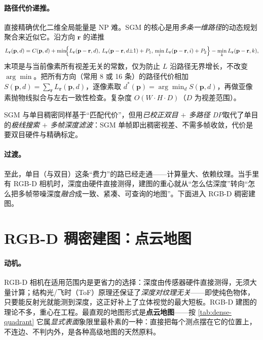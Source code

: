 \paragraph{路径代价递推。}
直接精确优化二维全局能量是 NP 难。SGM 的核心是用\emph{多条一维路径}的动态规划聚合来近似它。沿方向 $\mathbf{r}$ 的递推
\begin{equation}
  L_{\mathbf{r}}(\mathbf{p},d)=C(\mathbf{p},d)+\min\!\Bigl\{
   L_{\mathbf{r}}(\mathbf{p}-\mathbf{r},d),\,
   L_{\mathbf{r}}(\mathbf{p}-\mathbf{r},d{\pm}1)+P_1,\,
   \min_i L_{\mathbf{r}}(\mathbf{p}-\mathbf{r},i)+P_2\Bigr\}
   -\min_k L_{\mathbf{r}}(\mathbf{p}-\mathbf{r},k),
  \label{eq:dense-sgm-path}
\end{equation}
末项是与当前像素所有视差无关的常数，仅为防止 $L$ 沿路径无界增长，不改变 $\arg\min$。把所有方向（常用 8 或 16 条）的路径代价相加 $S(\mathbf{p},d)=\sum_{\mathbf{r}}L_{\mathbf{r}}(\mathbf{p},d)$，逐像素取 $d^*(\mathbf{p})=\arg\min_d S(\mathbf{p},d)$，再做亚像素抛物线拟合与左右一致性检查。复杂度 $O(W\cdot H\cdot D)$（$D$ 为视差范围）。

\begin{insight}
SGM 与单目稠密同样基于“匹配代价”，但用\emph{已校正双目 $+$ 多路径 DP}取代了单目的\emph{极线搜索 $+$ 多帧深度滤波}：SGM 单帧即出稠密视差、不需多帧收敛，代价是要双目硬件与精确标定。
\end{insight}

\paragraph{过渡。}
至此，单目（与双目）这条“费力”的路已经走通——计算量大、依赖纹理。当手里有 RGB-D 相机时，深度由硬件直接测得，建图的重心就从“怎么估深度”转向“怎么把多帧带噪深度\emph{融合}成一致、紧凑、可查询的地图”。下面进入 RGB-D 稠密建图。

\section{RGB-D 稠密建图：点云地图}
\label{sec:dense-rgbd-pc}

\paragraph{动机。}
RGB-D 相机在适用范围内是更省力的选择：深度由传感器硬件直接测得，无须大量计算；结构光/飞时（ToF）原理还保证了\emph{深度对纹理无关}——即使纯色物体，只要能反射光就能测到深度，这正好补上了立体视觉的最大短板\cite{gaoxiang2019slam14}。RGB-D 建图的理论不多，重心在工程。最直观的地图形式是\textbf{点云地图}——按 \cref{tab:dense-quadrant} 它属\emph{显式表面}象限里最朴素的一种：直接把每个测点摆在它的位置上，不连边、不判内外，是各种高级地图的天然原料。


